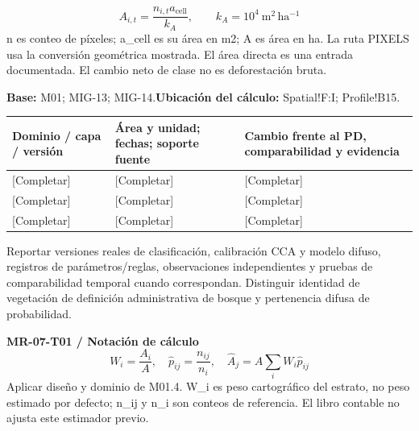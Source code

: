 {\fontsize{10}{12}\selectfont\[A_{i,t}=\frac{n_{i,t}a_{\mathrm{cell}}}{k_A},\qquad k_A=10^4\ \mathrm{m^2\,ha^{-1}}\]}
n es conteo de píxeles; a\_cell es su área en m2; A es área en ha. La ruta PIXELS usa la conversión geométrica mostrada. El área directa es una entrada documentada. El cambio neto de clase no es deforestación bruta.\par
\textbf{Base:} M01; MIG-13; MIG-14.\quad\textbf{Ubicación del cálculo:} Spatial!F:I; Profile!B15.\par\endgroup
{\sffamily\fontsize{8.6}{10.7}\selectfont\begin{longtable}{@{}P{48mm}P{61mm}P{53mm}@{}}
\toprule
\textbf{Dominio / capa / versión} & \textbf{Área y unidad; fechas; soporte fuente} & \textbf{Cambio frente al PD, comparabilidad y evidencia}\\\midrule\endhead
\rule{0pt}{8mm}[Completar] & [Completar] & [Completar]\\\hline
\rule{0pt}{8mm}[Completar] & [Completar] & [Completar]\\\hline
\rule{0pt}{8mm}[Completar] & [Completar] & [Completar]\\\hline
\end{longtable}}
Reportar versiones reales de clasificación, calibración CCA y modelo difuso, registros de parámetros/reglas, observaciones independientes y pruebas de comparabilidad temporal cuando correspondan. Distinguir identidad de vegetación de definición administrativa de bosque y pertenencia difusa de probabilidad.\par
{}
\par\begingroup\sffamily\fontsize{8.4}{10.5}\selectfont\color{NEBGreen}
\textbf{MR-07-T01 / Notación de cálculo}\
{\fontsize{10}{12}\selectfont\[W_i=\frac{A_i}{A},\quad \widehat p_{ij}=\frac{n_{ij}}{n_i},\quad \widehat A_j=A\sum_i W_i\widehat p_{ij}\]}
Aplicar diseño y dominio de M01.4. W\_i es peso cartográfico del estrato, no peso estimado por defecto; n\_ij y n\_i son conteos de referencia. El libro contable no ajusta este estimador previo.\par
